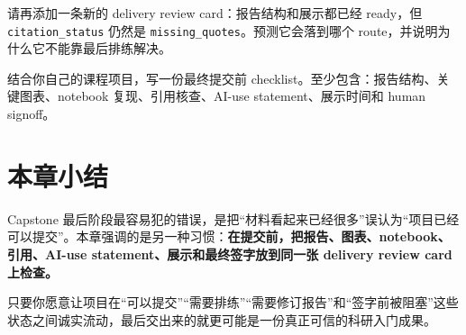 \begin{exercisebox}[进阶练习]
请再添加一条新的 delivery review card：报告结构和展示都已经 ready，但 \texttt{citation\_status} 仍然是 \texttt{missing\_quotes}。预测它会落到哪个 route，并说明为什么它不能靠最后排练解决。
\end{exercisebox}

\begin{exercisebox}[开放练习]
结合你自己的课程项目，写一份最终提交前 checklist。至少包含：报告结构、关键图表、notebook 复现、引用核查、AI-use statement、展示时间和 human signoff。
\end{exercisebox}

\section{本章小结}

Capstone 最后阶段最容易犯的错误，是把“材料看起来已经很多”误认为“项目已经可以提交”。本章强调的是另一种习惯：\textbf{在提交前，把报告、图表、notebook、引用、AI-use statement、展示和最终签字放到同一张 delivery review card 上检查。}

只要你愿意让项目在“可以提交”“需要排练”“需要修订报告”和“签字前被阻塞”这些状态之间诚实流动，最后交出来的就更可能是一份真正可信的科研入门成果。
